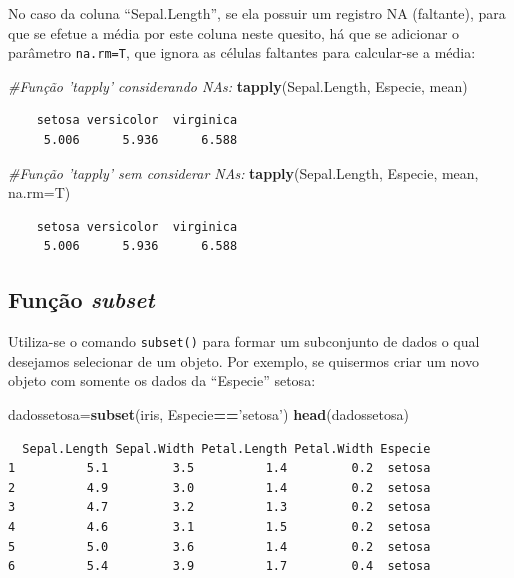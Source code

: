 \documentclass[12pt,brazil,oneside]{book}
\newenvironment{Shaded}{\begin{snugshade}}{\end{snugshade}}
\newcommand{\CommentTok}[1]{\textcolor[rgb]{0.56,0.35,0.01}{\textit{#1}}}
\newcommand{\DataTypeTok}[1]{\textcolor[rgb]{0.13,0.29,0.53}{#1}}
\newcommand{\KeywordTok}[1]{\textcolor[rgb]{0.13,0.29,0.53}{\textbf{#1}}}
\newcommand{\NormalTok}[1]{#1}
\newcommand{\OperatorTok}[1]{\textcolor[rgb]{0.81,0.36,0.00}{\textbf{#1}}}
\newcommand{\StringTok}[1]{\textcolor[rgb]{0.31,0.60,0.02}{#1}}
\begin{document}
No caso da coluna ``Sepal.Length'', se ela possuir um registro NA (faltante), para que se efetue a média por este coluna neste quesito, há que se adicionar o parâmetro \texttt{na.rm=T}, que ignora as células faltantes para calcular-se a média:

\begin{Shaded}
\begin{Highlighting}[]
\CommentTok{#Função 'tapply' considerando NAs:}
\KeywordTok{tapply}\NormalTok{(Sepal.Length, Especie, mean)}
\end{Highlighting}
\end{Shaded}

\begin{verbatim}
    setosa versicolor  virginica 
     5.006      5.936      6.588 
\end{verbatim}

\begin{Shaded}
\begin{Highlighting}[]
\CommentTok{#Função 'tapply' sem considerar NAs:}
\KeywordTok{tapply}\NormalTok{(Sepal.Length, Especie, mean, }\DataTypeTok{na.rm=}\NormalTok{T)}
\end{Highlighting}
\end{Shaded}

\begin{verbatim}
    setosa versicolor  virginica 
     5.006      5.936      6.588 
\end{verbatim}

\hypertarget{funcao-subset}{%
\subsection{\texorpdfstring{Função \emph{subset}}{Função subset}}\label{funcao-subset}}

Utiliza-se o comando \texttt{subset()} para formar um subconjunto de dados o qual desejamos selecionar de um objeto. Por exemplo, se quisermos criar um novo objeto com somente os dados da ``Especie'' setosa:

\begin{Shaded}
\begin{Highlighting}[]
\NormalTok{dadossetosa=}\KeywordTok{subset}\NormalTok{(iris, Especie}\OperatorTok{==}\StringTok{'setosa'}\NormalTok{)}
\KeywordTok{head}\NormalTok{(dadossetosa)}
\end{Highlighting}
\end{Shaded}

\begin{verbatim}
  Sepal.Length Sepal.Width Petal.Length Petal.Width Especie
1          5.1         3.5          1.4         0.2  setosa
2          4.9         3.0          1.4         0.2  setosa
3          4.7         3.2          1.3         0.2  setosa
4          4.6         3.1          1.5         0.2  setosa
5          5.0         3.6          1.4         0.2  setosa
6          5.4         3.9          1.7         0.4  setosa
\end{verbatim}
\end{document}
